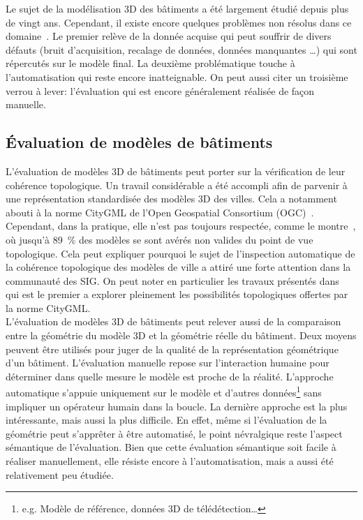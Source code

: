         Le sujet de la modélisation 3D des bâtiments a été largement étudié depuis plus de vingt ans.
        Cependant, il existe encore quelques problèmes non résolus dans ce domaine~\parencite{musialski2013survey,lafarge2015some}.
        Le premier relève de la donnée acquise qui peut souffrir de divers défauts (bruit d'acquisition, recalage de données, données manquantes \dots) qui sont répercutés sur le modèle final.
        La deuxième problématique touche à l'automatisation qui reste encore inatteignable.
        On peut aussi citer un troisième verrou à lever: l'évaluation qui est encore généralement réalisée de façon manuelle.

    \subsection*{\'Evaluation de modèles de bâtiments}
        L'évaluation de modèles 3D de bâtiments peut porter sur la vérification de leur cohérence topologique.
        Un travail considérable a été accompli afin de parvenir à une représentation standardisée des modèles 3D des villes.
        Cela a notamment abouti à la norme CityGML de l'Open Geospatial Consortium (OGC)~\parencite{groger2012citygml}.
        Cependant, dans la pratique, elle n'est pas toujours respectée, comme le montre~\parencite{biljecki2016most}, où jusqu'à \SI[locale=FR]{89}{\percent} des modèles se sont avérés non valides du point de vue topologique.
        Cela peut expliquer pourquoi le sujet de l'inspection automatique de la cohérence topologique des modèles de ville a attiré une forte attention dans la communauté des SIG.
        On peut noter en particulier les travaux présentés dans~\parencite{ledoux2013validation} qui est le premier a explorer pleinement les possibilités topologiques offertes par la norme CityGML.\\

        L'évaluation de modèles 3D de bâtiments peut relever aussi de la comparaison entre la géométrie du modèle 3D et la géométrie réelle du bâtiment.
        Deux moyens peuvent être utilisés pour juger de la qualité de la représentation géométrique d'un bâtiment.
        L'évaluation manuelle repose sur l'interaction humaine pour déterminer dans quelle mesure le modèle est proche de la réalité.
        L'approche automatique s'appuie uniquement sur le modèle et d'autres données\footnote{e.g. Modèle de référence, données 3D de télédétection\dots} sans impliquer un opérateur humain dans la boucle.
        La dernière approche est la plus intéressante, mais aussi la plus difficile.
        En effet, même si l'évaluation de la géométrie peut s'apprêter à être automatisé, le point névralgique reste l'aspect sémantique de l'évaluation.
        Bien que cette évaluation sémantique soit facile à réaliser manuellement, elle résiste encore à l'automatisation, mais a aussi été relativement peu étudiée.

